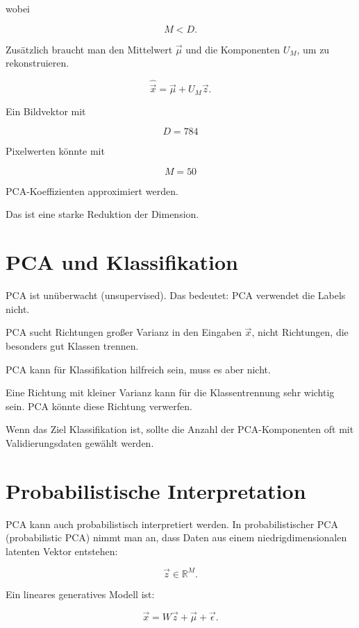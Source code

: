 wobei

\[
    M<D.
\]

Zusätzlich braucht man den Mittelwert \(\vec{\mu}\) und die Komponenten \(U_M\), um zu rekonstruieren.

\[
    \hat{\vec{x}}
    =
    \vec{\mu}
    +
    U_M\vec{z}.
\]

\begin{examplebox}
Ein Bildvektor mit

\[
    D=784
\]

Pixelwerten könnte mit

\[
    M=50
\]

PCA-Koeffizienten approximiert werden.

Das ist eine starke Reduktion der Dimension.
\end{examplebox}

\section{PCA und Klassifikation}

PCA ist unüberwacht (unsupervised).
Das bedeutet:
PCA verwendet die Labels nicht.

PCA sucht Richtungen großer Varianz in den Eingaben \(\vec{x}\), nicht Richtungen, die besonders gut Klassen trennen.

\begin{notebox}
PCA kann für Klassifikation hilfreich sein, muss es aber nicht.

Eine Richtung mit kleiner Varianz kann für die Klassentrennung sehr wichtig sein.
PCA könnte diese Richtung verwerfen.
\end{notebox}

Wenn das Ziel Klassifikation ist, sollte die Anzahl der PCA-Komponenten oft mit Validierungsdaten gewählt werden.

\section{Probabilistische Interpretation}

PCA kann auch probabilistisch interpretiert werden.
In probabilistischer PCA (probabilistic PCA) nimmt man an, dass Daten aus einem niedrigdimensionalen latenten Vektor entstehen:

\[
    \vec{z}
    \in
    \mathbb{R}^M.
\]

Ein lineares generatives Modell ist:

\[
    \vec{x}
    =
    W\vec{z}
    +
    \vec{\mu}
    +
    \vec{\epsilon}.
\]

